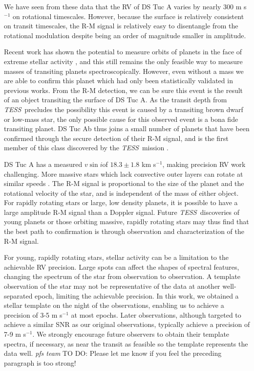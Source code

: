 \documentclass[twocolumn]{aastex63}
\newcommand{\tess}{{\it TESS}}
\newcommand{\vsini}{{$v \sin i$}}
\newcommand{\todo}[3]{{\color{#2} \emph{#1} TO DO: #3}}
\begin{document}
We have seen from these data that the RV of DS Tuc A varies by nearly 300 m s$^{-1}$ on rotational timescales. 
However, because the surface is relatively consistent on transit timescales, the R-M signal is relatively easy to disentangle from the rotational modulation despite being an order of magnitude smaller in amplitude.

Recent work has shown the potential to measure orbits of planets in the face of extreme stellar activity \citep{Barragan19}, and this still remains the only feasible way to measure masses of transiting planets spectroscopically. 
However, even without a mass we are able to confirm this planet which had only been statistically validated in previous works. 
From the R-M detection, we can be sure this event is the result of an object transiting the surface of DS Tuc A. 
As the transit depth from \tess\ precludes the possibility this event is caused by a transiting brown dwarf or low-mass star, the only possible cause for this observed event is a bona fide transiting planet.
DS Tuc Ab thus joins a small number of planets that have been confirmed through the secure detection of their R-M signal, and is the first member of this class discovered by the \tess\ mission \citep{Jenkins10b, Hirano12b}. 

DS Tuc A has a measured \vsini of $18.3 \pm 1.8$ km s$^{-1}$, making precision RV work challenging.
More massive stars which lack convective outer layers can rotate at similar speeds \citep[e.g.][]{McQuillan14}. 
The R-M signal is proportional to the size of the planet and the rotational velocity of the star, and is independent of the mass of either object. 
For rapidly rotating stars or large, low density planets, it is possible to have a large amplitude R-M signal than a Doppler signal. 
Future \tess\ discoveries of young planets or those orbiting massive, rapidly rotating stars may thus find that the best path to confirmation is through observation and characterization of the R-M signal.

For young, rapidly rotating stars, stellar activity can be a limitation to the achievable RV precision.
Large spots can affect the shapes of spectral features, changing the spectrum of the star from observation to observation. 
A template observation of the star may not be representative of the data at another well-separated epoch, limiting the achievable precision.
In this work, we obtained a stellar template on the night of the observations, enabling us to achieve a precision of 3-5 m s$^{-1}$ at most epochs. 
Later observations, although targeted to achieve a similar SNR as our original observations, typically achieve a precision of 7-9 m s$^{-1}$. 
We strongly encourage future observers to obtain their template spectra, if necessary, as near the transit as feasible so the template represents the data well.
\todo{pfs team}{red}{Please let me know if you feel the preceding paragraph is too strong!}
\end{document}
